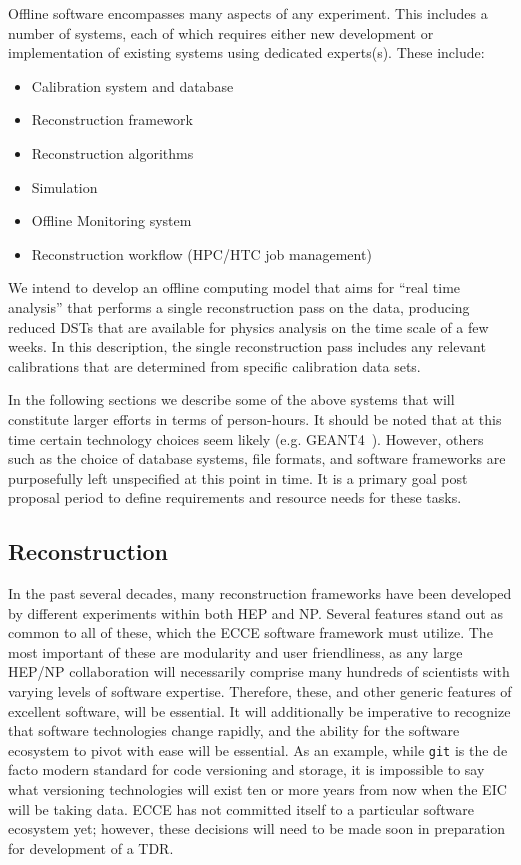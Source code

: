

Offline software encompasses many aspects of any experiment. This includes a number of systems, each of which requires either new development or implementation of existing systems using dedicated experts(s). These include:

\begin{itemize}
    \item Calibration system and database
    \item Reconstruction framework
    \item Reconstruction algorithms
    \item Simulation
    \item Offline Monitoring system
    \item Reconstruction workflow (HPC/HTC job management)
\end{itemize}

We intend to develop an offline computing model that aims for ``real time analysis'' that performs a single reconstruction pass on the data, producing reduced DSTs that are available for physics analysis on the time scale of a few weeks. In this description, the single reconstruction pass includes any relevant calibrations that are determined from specific calibration data sets. 

In the following sections we describe some of the above systems that will constitute larger efforts in terms of person-hours. It should be noted that at this time certain technology choices seem likely (e.g. GEANT4~\cite{ALLISON2016186}). However, others such as the choice of database systems, file formats, and software frameworks are purposefully left unspecified at this point in time. It is a primary goal post proposal period to define requirements and resource needs for these tasks.

\subsection{Reconstruction}\label{subsec:reconstruction}

In the past several decades, many reconstruction frameworks have been developed by different experiments within both HEP and NP. Several features stand out as common to all of these, which the ECCE software framework must utilize. The most important of these are modularity and user friendliness, as any large HEP/NP collaboration will necessarily comprise many hundreds of scientists with varying levels of software expertise. Therefore, these, and other generic features of excellent software, will be essential. It will additionally be imperative to recognize that software technologies change rapidly, and the ability for the software ecosystem to pivot with ease will be essential. As an example, while \texttt{git} is the de facto modern standard for code versioning and storage, it is impossible to say what versioning technologies will exist ten or more years from now when the EIC will be taking data. ECCE has not committed itself to a particular software ecosystem yet; however, these decisions will need to be made soon in preparation for development of a TDR.

